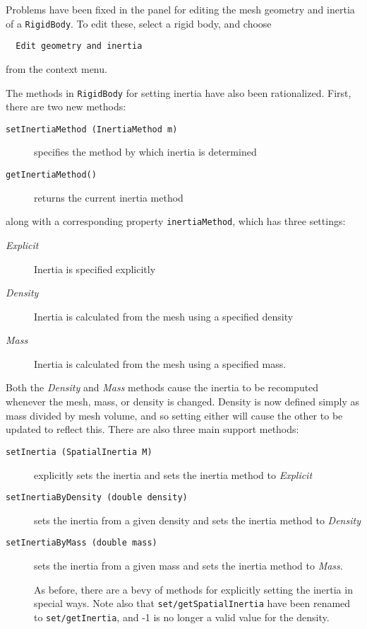 \documentclass{article}
\begin{document}
Problems have been fixed in the panel for editing the mesh geometry
and inertia of a {\tt RigidBody}. To edit these, select a rigid body, and
choose

\begin{verbatim}
  Edit geometry and inertia
\end{verbatim}

from the context menu.

The methods in {\tt RigidBody} for setting inertia have also been
rationalized. First, there are two new methods:

\begin{description}

\item[{\tt setInertiaMethod (InertiaMethod m)}] \mbox{}
  specifies the method by which inertia is determined

\item[{\tt getInertiaMethod()}]  \mbox{}
  returns the current inertia method

\end{description}

along with a corresponding property {\tt inertiaMethod}, which has three settings:

\begin{description}

\item[{\it Explicit}] \mbox{}
  Inertia is specified explicitly
\item[{\it Density}] \mbox{}
  Inertia is calculated from the mesh using a specified density
\item[{\it Mass}] \mbox{}
  Inertia is calculated from the mesh using a specified mass.

\end{description}

Both the {\it Density} and {\it Mass} methods cause the inertia to be
recomputed whenever the mesh, mass, or density is changed. Density is
now defined simply as mass divided by mesh volume, and so setting
either will cause the other to be updated to reflect this. There
are also three main support methods:

\begin{description}

\item[{\tt setInertia (SpatialInertia M)}] \mbox{}
  explicitly sets the inertia and sets the inertia method
  to {\it Explicit}

\item[{\tt setInertiaByDensity (double density)}] \mbox{}
  sets the inertia from a given density and sets the inertia method to {\it Density}

\item[{\tt setInertiaByMass (double mass)}] \mbox{}
  sets the inertia from a given mass and sets the inertia method to {\it Mass}.

As before, there are a bevy of methods for explicitly setting the
inertia in special ways. Note also that {\tt set/getSpatial\-Inertia} have
been renamed to {\tt set/getInertia}, and -1 is no longer a valid value
for the density.

\end{description}
\end{document}
